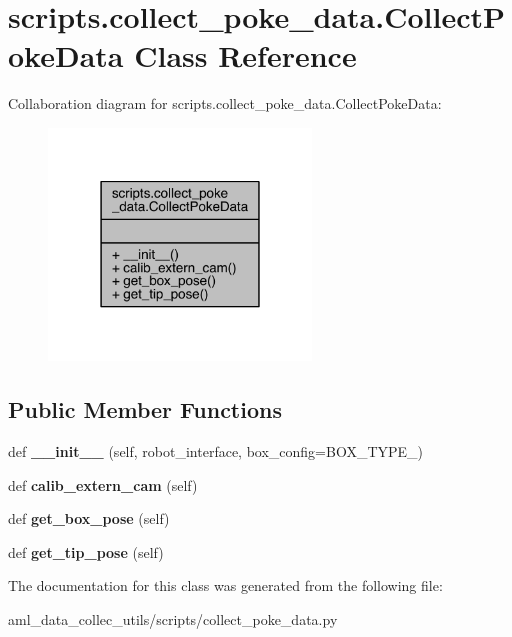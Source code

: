 \hypertarget{classscripts_1_1collect__poke__data_1_1_collect_poke_data}{}\section{scripts.\+collect\+\_\+poke\+\_\+data.\+Collect\+Poke\+Data Class Reference}
\label{classscripts_1_1collect__poke__data_1_1_collect_poke_data}


Collaboration diagram for scripts.\+collect\+\_\+poke\+\_\+data.\+Collect\+Poke\+Data\+:\nopagebreak
\begin{figure}[H]
\begin{center}
\leavevmode
\includegraphics[width=198pt]{classscripts_1_1collect__poke__data_1_1_collect_poke_data__coll__graph}
\end{center}
\end{figure}
\subsection*{Public Member Functions}
\begin{DoxyCompactItemize}
\item 
\hypertarget{classscripts_1_1collect__poke__data_1_1_collect_poke_data_a949ee1345c3d5e23944cebb1c565b65c}{}\label{classscripts_1_1collect__poke__data_1_1_collect_poke_data_a949ee1345c3d5e23944cebb1c565b65c} 
def {\bfseries \+\_\+\+\_\+init\+\_\+\+\_\+} (self, robot\+\_\+interface, box\+\_\+config=B\+O\+X\+\_\+\+T\+Y\+P\+E\+\_)
\item 
\hypertarget{classscripts_1_1collect__poke__data_1_1_collect_poke_data_acd76f6287f20334cf672df0b8112ae04}{}\label{classscripts_1_1collect__poke__data_1_1_collect_poke_data_acd76f6287f20334cf672df0b8112ae04} 
def {\bfseries calib\+\_\+extern\+\_\+cam} (self)
\item 
\hypertarget{classscripts_1_1collect__poke__data_1_1_collect_poke_data_a31e56ec91a9529fcf04e5c85ead5d82b}{}\label{classscripts_1_1collect__poke__data_1_1_collect_poke_data_a31e56ec91a9529fcf04e5c85ead5d82b} 
def {\bfseries get\+\_\+box\+\_\+pose} (self)
\item 
\hypertarget{classscripts_1_1collect__poke__data_1_1_collect_poke_data_afc60bf2012d30cc87ec83c4efe9031ee}{}\label{classscripts_1_1collect__poke__data_1_1_collect_poke_data_afc60bf2012d30cc87ec83c4efe9031ee} 
def {\bfseries get\+\_\+tip\+\_\+pose} (self)
\end{DoxyCompactItemize}


The documentation for this class was generated from the following file\+:\begin{DoxyCompactItemize}
\item 
aml\+\_\+data\+\_\+collec\+\_\+utils/scripts/collect\+\_\+poke\+\_\+data.\+py\end{DoxyCompactItemize}
